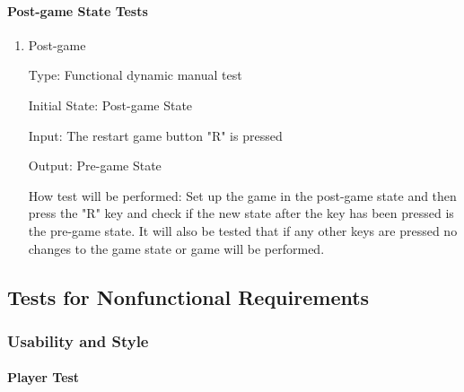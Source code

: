 \documentclass[12pt, titlepage]{article}
\begin{document}
\paragraph{Post-game State Tests}
\begin{enumerate}

\item{Post-game \\}

Type: Functional dynamic manual test

Initial State: Post-game State

Input: The restart game button "R" is pressed

Output: Pre-game State

How test will be performed: Set up the game in the post-game state and then press the "R" key and check if the new state after the key has been pressed is the pre-game state. It will also be tested that if any other keys are pressed no changes to the game state or game will be performed.
\end{enumerate}


\subsection{Tests for Nonfunctional Requirements}

\subsubsection{Usability and Style}

\paragraph{Player Test}
\end{document}
